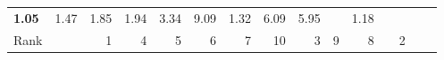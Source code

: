 \begin{tabular}{ll|rrrrrr|rrrrrrr}
  


  
  \textbf{1.05} & 1.47 & 1.85 & 1.94 & 3.34 & 9.09 & 1.32 & 6.09 & 5.95 &  & 1.18 \\

  Rank & &
  1 & 4 & 5 & 6 & 7 & 10 & 3 & 9 & 8 &  & 2 \\\hline\hline
  

\end{tabular}
